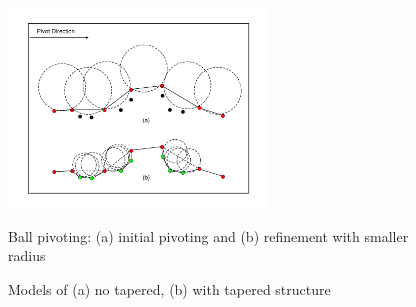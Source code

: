 \documentclass{llncs}
\begin{document}
\begin{figure}
\centering
\begin{minipage}[b]{.5\linewidth}
\centering
\includegraphics[width=2.7in]{figures/BPA.pdf}
\end{minipage}%
\hspace{1cm}%
\begin{minipage}[b]{.4\linewidth}
\centering
  \vspace{0.01cm}
\end{minipage}
\begin{minipage}[t]{.5\linewidth}
\caption{Ball pivoting: (a) initial pivoting and (b) refinement with smaller radius}
\label{fig_BPA}
\end{minipage}%
\hspace{1cm}%
\begin{minipage}[t]{.4\linewidth}
\caption{Models of (a) no tapered, (b) with tapered structure }
\label{fig_DXF_top}
\end{minipage}%
\end{figure}
\end{document}
